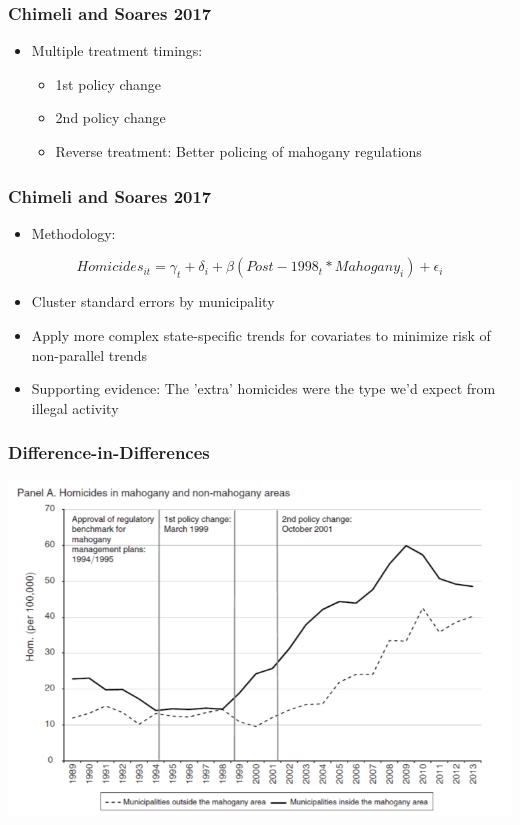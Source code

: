 \documentclass[xcolor=x11names,compress]{beamer}\usepackage[]{graphicx}\usepackage[]{color}
\renewcommand{\(}{\begin{columns}}
\renewcommand{\)}{\end{columns}}
\newcommand{\<}[1]{\begin{column}{#1}}
\renewcommand{\>}{\end{column}}
\begin{document}
\begin{frame}
\frametitle{Chimeli and Soares 2017}
\begin{itemize}
\item Multiple treatment timings:
\begin{itemize}
\item 1st policy change
\item 2nd policy change
\item Reverse treatment: Better policing of mahogany regulations
\end{itemize}
\end{itemize}
\end{frame}

\begin{frame}
\frametitle{Chimeli and Soares 2017}
\begin{itemize}
\item Methodology:
\pause
\end{itemize}
$$ Homicides_{it} = \gamma_t + \delta_i + \beta (Post-1998_t *  Mahogany_i) + \epsilon_i$$
\pause
\begin{itemize}
\item Cluster standard errors by municipality
\pause
\item Apply more complex state-specific trends for covariates to minimize risk of non-parallel trends
\pause
\item Supporting evidence: The 'extra' homicides were the type we'd expect from illegal activity
\end{itemize}
\end{frame}

\begin{frame}
\frametitle{Difference-in-Differences}
\begin{center}
\includegraphics[scale=0.35]{Mahogany.png}
\end{center}
\end{frame}
\end{document}
